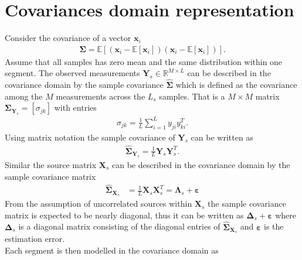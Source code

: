 \section{Covariances domain representation}
Consider the covariance of a vector $\textbf{x}_i$  
\begin{align*}
\boldsymbol{\Sigma}=\mathbb{E}[(\textbf{x}_i-\mathbb{E}[\textbf{x}_i])(\textbf{x}_i-\mathbb{E}[\textbf{x}_i])].
\end{align*} 
Assume that all samples has zero mean and the same distribution within one segment. The observed measurements $\mathbf{Y}_s \in \mathbb{R}^{M\times L}$ can be described in the covariance domain by the sample covariance $\hat{\boldsymbol{\Sigma}}$ which is defined as the covariance among the $M$ measurements across the $L_s$ samples. That is a $M \times M$ matrix $\boldsymbol{\Sigma}_{\mathbf{Y}_s}=[\sigma_{jk}]$ with entries 
\begin{align*}
\sigma_{jk}= \frac{1}{L}\sum_{i=1}^{L}y_{ji}y_{ki}^T.
\end{align*}
Using matrix notation the sample covariance of $\mathbf{Y}_s$ can be written as
\begin{align*}
\hat{\boldsymbol{\Sigma}}_{\mathbf{Y}_s} = \frac{1}{L} \mathbf{Y}_s \mathbf{Y}_s^T.
\end{align*}  
Similar the source matrix $\mathbf{X}_s$ can be described in the covariance domain by the sample covariance matrix
\begin{align*}
\hat{\boldsymbol{\Sigma}}_{\mathbf{X}_s} &= \frac{1}{L} \mathbf{X}_s \mathbf{X}_s^T = \boldsymbol{\Lambda}_s + \boldsymbol{\varepsilon} 
\end{align*}
From the assumption of uncorrelated sources within $\mathbf{X}_s$ the sample covariance matrix is expected to be nearly diagonal, thus it can be written as $\boldsymbol{\Delta}_s + \boldsymbol{\varepsilon}$ where $\boldsymbol{\Delta}_s$ is a diagonal matrix consisting of the diagonal entries of $\hat{\boldsymbol{\Sigma}}_{\mathbf{X}_s}$ and $ \boldsymbol{\varepsilon}$ is the estimation error\cite{Balkan2015}.
\\
Each segment is then modelled in the covariance domain as
